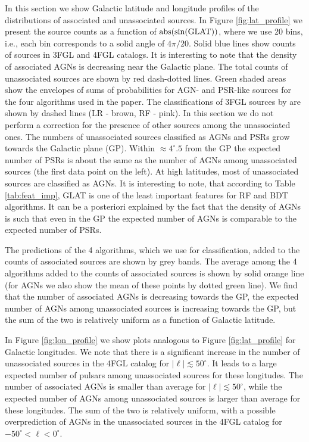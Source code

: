 In this section we show Galactic latitude and longitude profiles of the distributions of associated and unassociated sources.
In Figure \ref{fig:lat_profile} we present the source counts as a function of ${\rm abs(sin(GLAT))}$,
where we use 20 bins, i.e., each bin corresponds to a solid angle of $4 \pi / 20$. 
Solid blue lines show counts of sources in 3FGL and 4FGL catalogs.
It is interesting to note that the density of associated AGNs is decreasing near the Galactic plane.
The total counts of unassociated sources are shown by red dash-dotted lines.
Green shaded areas show the envelopes of sums of probabilities for AGN- and PSR-like sources for the four algorithms used in the paper.
The classifications of 3FGL sources by \cite{2016ApJ...820....8S} are shown by dashed lines (LR - brown, RF - pink).
In this section we do not perform a correction for the presence of other sources among the unassociated ones.
The numbers of unassociated sources classified as AGNs and PSRs grow towards the Galactic plane (GP).
Within $\approx 4^\circ.5$ from the GP the expected number of PSRs is about the same as the number of AGNs among unassociated sources (the first data point on the left).
At high latitudes, most of unassociated sources are classified as AGNs.
It is interesting to note, that according to Table \ref{tab:feat_imp}, GLAT is one of the least important features for RF and BDT algorithms.
It can be a posteriori explained by the fact that
 the density of AGNs is such that even in the GP the expected number of AGNs is comparable to the expected number of PSRs.

The predictions of the 4 algorithms, which we use for classification, added to the counts of associated sources are shown by grey bands.
The average among the 4 algorithms added to the counts of associated sources is shown by solid orange line 
(for AGNs we also show the mean of these points by dotted green line).
We find that the number of associated AGNs is decreasing towards the GP, the expected number of AGNs among unassociated sources is increasing towards the GP, but the sum of the two is relatively uniform as a function of Galactic latitude.



In Figure \ref{fig:lon_profile} we show plots analogous to Figure \ref{fig:lat_profile} for Galactic longitudes.
We note that there is a significant increase in the number of unassociated sources in the 4FGL catalog for $|\ell | \lesssim 50^\circ$.
It leads to a large expected number of pulsars among unassociated sources for these longitudes.
The number of associated AGNs is smaller than average for $|\ell | \lesssim 50^\circ$, while the expected number of AGNs among unassociated sources is larger than average for these longitudes.
The sum of the two is relatively uniform, with a possible overprediction of AGNs in the unassociated sources in the 4FGL catalog for $-50^\circ < \ell < 0^\circ$.










